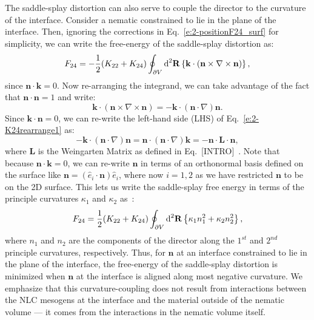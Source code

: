 The saddle-splay distortion can also serve to couple the director to the curvature of the interface.
Consider a nematic constrained to lie in the plane of the interface.
Then, ignoring the corrections in Eq.~\ref{e:2-positionF24_surf} for simplicity, we can write the free-energy of the saddle-splay distortion as:
\begin{equation}
  F_{24} = -\frac{1}{2}(K_{22} + K_{24})
  \oint_{\partial V}\textup{d}^2 \mathbf{R} \left \{\mathbf{k} \cdot ( \mathbf{n} \times \nabla \times \mathbf{n}) \right \},\label{e:2-K24PlanDegen}
\end{equation}
since $\mathbf{n} \cdot \mathbf{k} = 0$. Now re-arranging the integrand, we can take advantage of the fact that $\mathbf{n} \cdot \mathbf{n}=1$ and write:
\begin{equation}
  \mathbf{k} \cdot ( \mathbf{n} \times \nabla \times \mathbf{n}) = -\mathbf{k} \cdot (\mathbf{n} \cdot \nabla)\mathbf{n}.\label{e:2-K24rearrange1}
\end{equation}
Since $\mathbf{k} \cdot \mathbf{n} = 0$, we can re-write the left-hand side (LHS) of Eq.~\ref{e:2-K24rearrange1} as:
\begin{equation}
  -\mathbf{k} \cdot (\mathbf{n} \cdot \nabla)\mathbf{n} = \mathbf{n} \cdot (\mathbf{n} \cdot \nabla)\mathbf{k} = -\mathbf{n} \cdot \mathbf{L} \cdot \mathbf{n},\label{e:2-K24rearrange2}
\end{equation}
where $\mathbf{L}$ is the Weingarten Matrix as defined in Eq.~[INTRO]~\cite{RN23,RN35}.
Note that because $\mathbf{n} \cdot \mathbf{k}=0$, we can re-write $\mathbf{n}$ in terms of an orthonormal basis defined on the surface like $\mathbf{n} = (\hat{e}_i \cdot \mathbf{n})\hat{e}_i$, where now $i = 1,2$ as we have restricted $\mathbf{n}$ to be on the 2D surface.
This lets us write the saddle-splay free energy in terms of the principle curvatures $\kappa_1$ and $\kappa_2$ as~\cite{RN59}:
\begin{equation}
  F_{24} = \frac{1}{2}(K_{22} + K_{24})
  \oint_{\partial V}\textup{d}^2 \mathbf{R} \left \{\kappa_1 n_1^2 + \kappa_2 n_2^2 \right \},\label{e:2-K24SurfCouple}
\end{equation}
where $n_1$ and $n_2$ are the components of the director along the $1^{st}$ and $2^{nd}$ principle curvatures, respectively.
Thus, for $\mathbf{n}$ at an interface constrained to lie in the plane of  the interface, the free-energy of the saddle-splay distortion is minimized when $\mathbf{n}$ at the interface is aligned along most negative curvature.
We emphasize that this curvature-coupling does not result from interactions between the NLC mesogens at the interface and the material outside of the nematic volume --- it comes from the interactions in the nematic volume itself.





